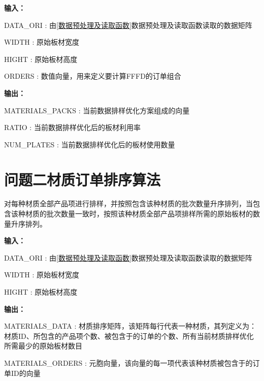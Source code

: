 \documentclass[bwprint]{gmcmthesis}
\begin{document}
\textbf{输入：} 

DATA\_ORI : 由\ref{数据预处理及读取函数}数据预处理及读取函数读取的数据矩阵

WIDTH : 原始板材宽度

HIGHT : 原始板材高度

ORDERS : 数值向量，用来定义要计算FFFD的订单组合

\textbf{输出：} 

MATERIALS\_PACKS : 当前数据排样优化方案组成的向量

RATIO : 当前数据排样优化后的板材利用率

NUM\_PLATES : 当前数据排样优化后的板材使用数量


\newpage
\section{问题二材质订单排序算法}

对每种材质全部产品项进行排样，并按照包含该种材质的批次数量升序排列，当包含该种材质的批次数量一致时，按照该种材质全部产品项排样所需的原始板材的数量升序排列。

\textbf{输入：} 

DATA\_ORI : 由\ref{数据预处理及读取函数}数据预处理及读取函数读取的数据矩阵

WIDTH : 原始板材宽度

HIGHT : 原始板材高度

\textbf{输出：} 

MATERIALS\_DATA : 材质排序矩阵，该矩阵每行代表一种材质，其列定义为：材质ID、所包含的产品项个数、被包含于的订单的个数、所有当前材质排样优化所需最少的原始板材数目

MATERIALS\_ORDERS : 元胞向量，该向量的每一项代表该种材质被包含于的订单ID的向量


\end{document}
